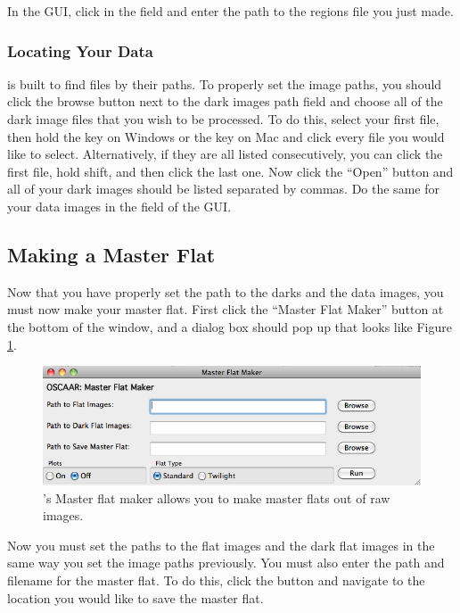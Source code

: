 \documentclass[a4paper]{article}
\begin{document}
In the \oscaar GUI, click  in the  field and enter the path to the regions file you just made.

\subsubsection{Locating Your Data}

	\oscaar  is built to find files by their paths. To properly set the image paths, you should click the browse button next to the dark images path field and choose all of the dark image files that you wish to be processed. To do this, select your first file, then hold the  key on Windows or the  key on Mac and click every file you would like to select. Alternatively, if they are all listed consecutively, you can click the first file, hold shift, and then click the last one. Now click the ``Open'' button and all of your dark images should be listed separated by commas. Do the same for your data images in the  field of the \oscaar GUI.
	
\subsection{Making a Master Flat}
Now that you have properly set the path to the darks and the data images, you must now make your master flat. First click the ``Master Flat Maker'' button at the bottom of the \oscaar window, and a dialog box should pop up that looks like Figure \ref{fig:flats}.
\begin{figure}[h]
\begin{center}
\includegraphics[scale=0.25]{imgs/flatMaker.png}
\caption{\oscaar's Master flat maker allows you to make master flats out of raw images.}
\label{fig:flats}
\end{center}	
\end{figure}

Now you must set the paths to the flat images and the dark flat images in the same way you set the image paths previously. You must also enter the path and filename for the master flat. To do this, click the  button and navigate to the location you would like to save the master flat. 
\end{document}
